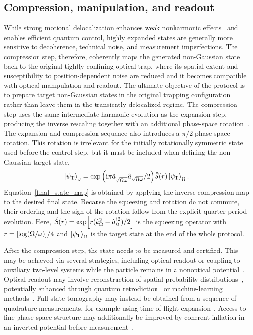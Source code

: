 \documentclass[reprint,prx,footinbib,floatfix,twocolumn,longbibliography,superscriptaddress]{revtex4-2}
\begin{document}
\subsection{Compression, manipulation, and readout}
While strong motional delocalization enhances weak nonharmonic effects~\cite{Rosiek2024} and enables efficient quantum control, highly expanded states are generally more sensitive to decoherence, technical noise, and measurement imperfections.
The compression step, therefore, coherently maps the generated non-Gaussian state back to the original tightly confining optical trap, where its spatial extent and susceptibility to position-dependent noise are reduced and it becomes compatible with optical manipulation and readout.
The ultimate objective of the protocol is to prepare target non-Gaussian states in the original trapping configuration rather than leave them in the transiently delocalized regime.
The compression step uses the same intermediate harmonic evolution as the expansion step, producing the inverse rescaling together with an additional phase-space rotation~\cite{Weiss2021,Roda-Llordes2024b,Ji2026}.
The expansion and compression sequence also introduces a $\pi / 2$ phase-space rotation.
This rotation is irrelevant for the initially rotationally symmetric state used before the control step, but it must be included when defining the non-Gaussian target state,
\begin{align}
    \ket{\psi_\text{T}}_{\omega} = \exp\Big(\text{i} \pi \hat{a}^\dagger_{\sqrt{\Omega\omega}} \hat{a}_{\sqrt{\Omega\omega}}/2\Big)\hat{S}(r)\ket{\psi_\text{T}}_{\Omega}.
    \label{final_state_map}
\end{align}
Equation~\eqref{final_state_map} is obtained by applying the inverse compression map to the desired final state.
Because the squeezing and rotation do not commute, their ordering and the sign of the rotation follow from the explicit quarter-period evolution.
Here, $\hat{S}(r) =  \exp[r(\hat{a}_{\Omega}^{2}-\hat{a}_{\Omega}^{\dagger 2})/2]$ is the squeezing operator with $r =[ \log (\Omega / \omega)]/4$ and $\ket{\psi_\text{T}}_{\Omega}$ is the target state at the end of the whole protocol. 

After the compression step, the state needs to be measured and certified.
This may be achieved via several strategies, including optical readout or coupling to auxiliary two-level systems while the particle remains in a nonoptical potential~\cite{Streltsov2021}.
Optical readout may involve reconstruction of spatial probability distributions~\cite{Neumeier2024,Riera-Campeny2026}, potentially enhanced through quantum retrodiction~\cite{Rossi2019,Barnett2021,Lammers2024} or machine-learning methods~\cite{Weiss2019}.
Full state tomography may instead be obtained from a sequence of quadrature measurements, for example using time-of-flight expansion~\cite{Brown2023,Kamba2023}.
Access to fine phase-space structure may additionally be improved by coherent inflation in an inverted potential before measurement~\cite{Romero-Isart2017,Pino2018,Neumeier2024,Roda-Llordes2024b}.
\end{document}
